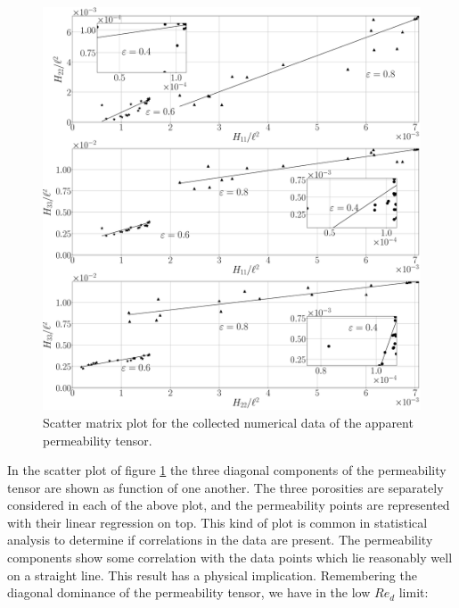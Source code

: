 %



\begin{figure}[H]
	\centering
	\includegraphics[width=1\linewidth]{chapter_4/figure/scatter_matrix}
	\caption{Scatter matrix plot for the collected numerical data of the apparent permeability tensor.}
	\label{fig:scatter_matrix}
\end{figure}


\newpage

In the scatter plot of figure \ref{fig:scatter_matrix} the three diagonal components of the permeability tensor are shown 
as function of one another. The three porosities are separately considered in each of the above plot, and the permeability points are 
represented with their linear regression on top. This kind of plot is common in statistical analysis to determine if correlations in the data 
are present.  The permeability components show some correlation with the data points which lie reasonably well on a straight line. This
result has a physical implication.
Remembering the diagonal dominance of the permeability tensor, we have in the low
$Re_d$ limit: 


